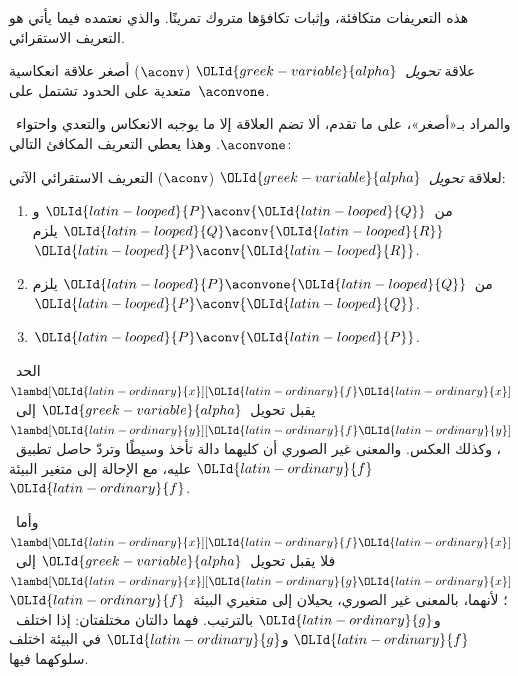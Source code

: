 \documentclass[../../../include/open-logic-section]{subfiles}
\begin{document}
هذه التعريفات متكافئة، وإثبات تكافؤها متروك تمرينًا. والذي نعتمده فيما يأتي هو التعريف الاستقرائي.

\begin{defn}
  علاقة \emph{تحويل~${\OLId{greek-variable}{alpha}}$} ($\aconv$) أصغر علاقة انعكاسية متعدية على الحدود
  تشتمل على~$\aconvone$.
\end{defn}

والمراد بـ«أصغر»، على ما تقدم، ألا تضم العلاقة إلا ما يوجبه الانعكاس والتعدي
واحتواء~$\aconvone$. وهذا يعطي التعريف المكافئ التالي:

\begin{defn} 
  لعلاقة \emph{تحويل~${\OLId{greek-variable}{alpha}}$} ($\aconv$) التعريف الاستقرائي الآتي:
  \begin{enumerate}
  \item من~${\OLId{latin-looped}{P}} \aconv {\OLId{latin-looped}{Q}}$ و${\OLId{latin-looped}{Q}} \aconv {\OLId{latin-looped}{R}}$ يلزم~${\OLId{latin-looped}{P}} \aconv {\OLId{latin-looped}{R}}$.
  \item من~${\OLId{latin-looped}{P}} \aconvone {\OLId{latin-looped}{Q}}$ يلزم~${\OLId{latin-looped}{P}} \aconv {\OLId{latin-looped}{Q}}$. 
  \item ${\OLId{latin-looped}{P}} \aconv {\OLId{latin-looped}{P}}$. 
  \end{enumerate}
\end{defn}

\begin{ex}
  الحد~$\lambd[{\OLId{latin-ordinary}{x}}][{\OLId{latin-ordinary}{f}} {\OLId{latin-ordinary}{x}}]$ يقبل تحويل~${\OLId{greek-variable}{alpha}}$ إلى~$\lambd[{\OLId{latin-ordinary}{y}}][{\OLId{latin-ordinary}{f}}
  {\OLId{latin-ordinary}{y}}]$، وكذلك العكس.
  والمعنى غير الصوري أن كليهما دالة تأخذ وسيطًا وتردّ حاصل تطبيق~${\OLId{latin-ordinary}{f}}$ عليه،
  مع الإحالة إلى متغير البيئة~${\OLId{latin-ordinary}{f}}$.

  وأما~$\lambd[{\OLId{latin-ordinary}{x}}][{\OLId{latin-ordinary}{f}} {\OLId{latin-ordinary}{x}}]$ فلا يقبل تحويل~${\OLId{greek-variable}{alpha}}$ إلى~$\lambd[{\OLId{latin-ordinary}{x}}][{\OLId{latin-ordinary}{g}}
    {\OLId{latin-ordinary}{x}}]$؛
  لأنهما، بالمعنى غير الصوري، يحيلان إلى متغيري البيئة~${\OLId{latin-ordinary}{f}}$ و${\OLId{latin-ordinary}{g}}$ بالترتيب.
  فهما دالتان مختلفتان: إذا اختلف~${\OLId{latin-ordinary}{f}}$ و${\OLId{latin-ordinary}{g}}$ في البيئة اختلف سلوكهما فيها.
\end{ex}
\end{document}
